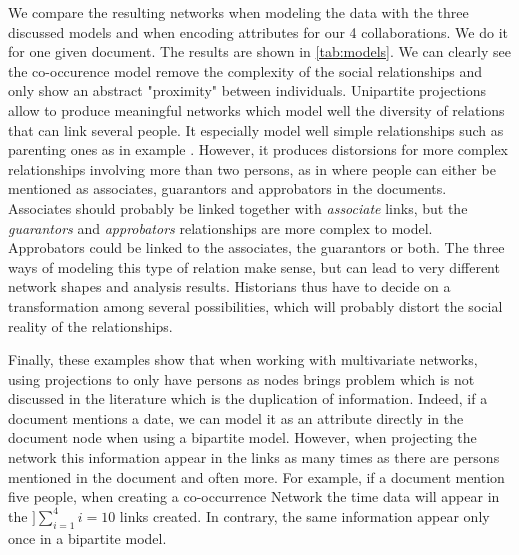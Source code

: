 \documentclass{vgtc}                          %
\begin{document}
We compare the resulting networks when modeling the data with the three discussed models and when encoding attributes for our 4 collaborations. We do it for one given document. The results are shown in \autoref{tab:models}.
We can clearly see the co-occurence model remove the complexity of the social relationships and only show an abstract "proximity" between individuals.  
Unipartite projections allow to produce meaningful networks which model well the diversity of relations that can link several people. It especially model well simple relationships such as parenting ones as in example \nicole. However, it produces distorsions for more complex relationships involving more than two persons, as in \pascal where people can either be mentioned as associates, guarantors and approbators in the documents. Associates should probably be linked together with \textit{associate} links, but the \textit{guarantors} and \textit{approbators} relationships are more complex to model. Approbators could be linked to the associates, the guarantors or both. The three ways of modeling this type of relation make sense, but can lead to very different network shapes and analysis results. Historians thus have to decide on a transformation among several possibilities, which will probably distort the social reality of the relationships.

Finally, these examples show that when working with multivariate networks, using projections to only have persons as nodes brings problem which is not discussed in the literature which is the duplication of information. Indeed, if a document mentions a date, we can model it as an attribute directly in the document node when using a bipartite model. However, when projecting the network this information appear in the links as many times as there are persons mentioned in the document and often more. For example, if a document mention five people, when creating a co-occurrence Network the time data will appear in the $]\displaystyle\sum_{i=1} ^{4} i = 10$ links created. In contrary, the same information appear only once in a bipartite model.
\end{document}
